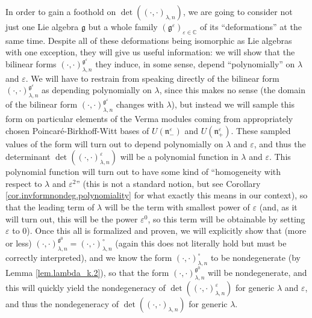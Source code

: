 \documentclass[etingof-lie.tex]{subfiles}
\begin{document}
In order to gain a foothold on $\det\left(  \left(  \cdot,\cdot\right)
_{\lambda,n}\right)  $, we are going to consider not just one Lie algebra
$\mathfrak{g}$ but a whole family $\left(  \mathfrak{g}^{\varepsilon}\right)
_{\varepsilon\in\mathbb{C}}$ of its ``deformations'' at the same time. Despite
all of these deformations being isomorphic as Lie algebras with one exception,
they will give us useful information: we will show that the bilinear forms
$\left(  \cdot,\cdot\right)  _{\lambda,n}^{\mathfrak{g}^{\varepsilon}}$ they
induce, in some sense, depend ``polynomially'' on $\lambda$ and $\varepsilon$.
We will have to restrain from speaking directly of the bilinear form $\left(
\cdot,\cdot\right)  _{\lambda,n}^{\mathfrak{g}^{\varepsilon}}$ as depending
polynomially on $\lambda$, since this makes no sense (the domain of the
bilinear form $\left(  \cdot,\cdot\right)  _{\lambda,n}^{\mathfrak{g}%
^{\varepsilon}}$ changes with $\lambda$), but instead we will sample this form
on particular elements of the Verma modules coming from appropriately chosen
Poincar\'{e}-Birkhoff-Witt bases of $U\left(  \mathfrak{n}_{-}^{\varepsilon
}\right)  $ and $U\left(  \mathfrak{n}_{+}^{\varepsilon}\right)  $. These
sampled values of the form will turn out to depend polynomially on $\lambda$
and $\varepsilon$, and thus the determinant $\det\left(  \left(  \cdot
,\cdot\right)  _{\lambda,n}^{\varepsilon}\right)  $ will be a polynomial
function in $\lambda$ and $\varepsilon$. This polynomial function will turn
out to have some kind of ``homogeneity with respect to $\lambda$ and
$\varepsilon^{2}$'' (this is not a standard notion, but see Corollary
\ref{cor.invformnondeg.polynomiality} for what exactly this means in our
context), so that the leading term of $\lambda$ will be the term with smallest
power of $\varepsilon$ (and, as it will turn out, this will be the power
$\varepsilon^{0}$, so this term will be obtainable by setting $\varepsilon$ to
$0$). Once this all is formalized and proven, we will explicitly show that
(more or less) $\left(  \cdot,\cdot\right)  _{\lambda,n}^{\mathfrak{g}^{0}%
}=\left(  \cdot,\cdot\right)  _{\lambda,n}^{\circ}$ (again this does not
literally hold but must be correctly interpreted), and we know the form
$\left(  \cdot,\cdot\right)  _{\lambda,n}^{\circ}$ to be nondegenerate (by
Lemma \ref{lem.lambda_k.2}), so that the form $\left(  \cdot,\cdot\right)
_{\lambda,n}^{\mathfrak{g}^{0}}$ will be nondegenerate, and this will quickly
yield the nondegeneracy of $\det\left(  \left(  \cdot,\cdot\right)
_{\lambda,n}^{\varepsilon}\right)  $ for generic $\lambda$ and $\varepsilon$,
and thus the nondegeneracy of $\det\left(  \left(  \cdot,\cdot\right)
_{\lambda,n}\right)  $ for generic $\lambda$.
\end{document}
